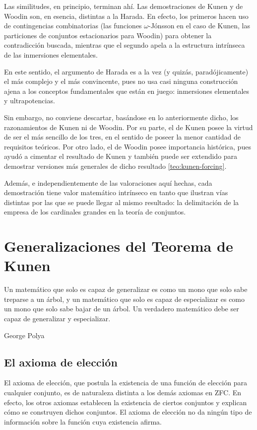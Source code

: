 \documentclass
[
  12pt,
  letterpaper,
  openany,
  oneside,
]{book}
\begin{document}
Las similitudes, en principio, terminan ahí. Las demostraciones de Kunen
y de Woodin son, en esencia, distintas a la Harada.
En efecto, los primeros hacen uso de contingencias combinatorias
(las funciones $\omega$-Jónsson en el caso de Kunen,
las particiones de conjuntos estacionarios para Woodin)
para obtener la contradicción buscada, mientras que el segundo
apela a la estructura intrínseca de las inmersiones elementales.

En este sentido, el argumento de Harada es a la vez (y quizás, paradójicamente)
el más complejo y el más convincente, pues no usa casi ninguna construcción
ajena a los conceptos fundamentales que están en juego: inmersiones elementales
y ultrapotencias.

Sin embargo, no conviene descartar, basándose en lo anteriormente dicho,
los razonamientos de Kunen ni de Woodin. Por su parte, el de Kunen posee
la virtud de ser el más sencillo de los tres, en el sentido de poseer
la menor cantidad de requisitos teóricos. Por otro lado, el de Woodin
posee importancia histórica, pues ayudó a cimentar el resultado
de Kunen y también puede ser extendido para demostrar versiones
más generales de dicho resultado \ref{teo:kunen-forcing}.

Además, e independientemente de las valoraciones aquí hechas,
cada demostración tiene valor matemático intrínseco en tanto
que ilustran vías distintas por las que se puede llegar al mismo
resultado: la delimitación de la empresa de los cardinales grandes
en la teoría de conjuntos.

\chapter{Generalizaciones del Teorema de Kunen}
\thispagestyle{empty}

\epigraph
{
    Un matemático que solo es capaz de generalizar es como
    un mono que solo sabe treparse a un árbol, y un matemático
    que solo es capaz de especializar es como un mono que solo
    sabe bajar de un árbol. Un verdadero matemático debe ser
    capaz de generalizar y especializar.
}
{George Polya \autocite[139]{machale_comic_1993}}

\section{El axioma de elección}

El axioma de elección, que postula la existencia
de una función de elección para cualquier conjunto,
es de naturaleza distinta a los demás axiomas en ZFC.
En efecto, los otros axiomas establecen la existencia
de ciertos conjuntos y explican cómo se construyen dichos
conjuntos. El axioma de elección no da ningún tipo de información
sobre la función cuya existencia afirma.
\end{document}
